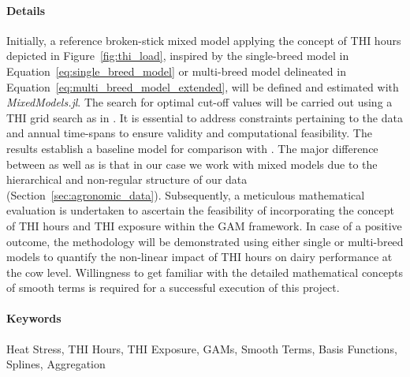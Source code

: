 \paragraph{Details} Initially, a reference broken-stick mixed model applying the concept of THI hours depicted in Figure~\ref{fig:thi_load}, inspired by the single-breed model in Equation~\ref{eq:single_breed_model} or multi-breed model delineated in Equation~\ref{eq:multi_breed_model_extended}, will be defined and estimated with \textit{MixedModels.jl}. The search for optimal cut-off values will be carried out using a THI grid search as in \cite{bucheli_heat_2022}. It is essential to address constraints pertaining to the data and annual time-spans to ensure validity and computational feasibility. The results establish a baseline model for comparison with \cite{vroege_effects_2023}. The major difference between \cite{bucheli_heat_2022} as well as \cite{vroege_effects_2023} is that in our case we work with mixed models due to the hierarchical and non-regular structure of our data (Section~\ref{sec:agronomic_data}). Subsequently, a meticulous mathematical evaluation is undertaken to ascertain the feasibility of incorporating the concept of THI hours and THI exposure within the GAM framework. In case of a positive outcome, the methodology will be demonstrated using either single or multi-breed models to quantify the non-linear impact of THI hours on dairy performance at the cow level. Willingness to get familiar with the detailed mathematical concepts of smooth terms is required for a successful execution of this project.

\paragraph{Keywords} Heat Stress, THI Hours, THI Exposure, GAMs, Smooth Terms, Basis Functions, Splines, Aggregation